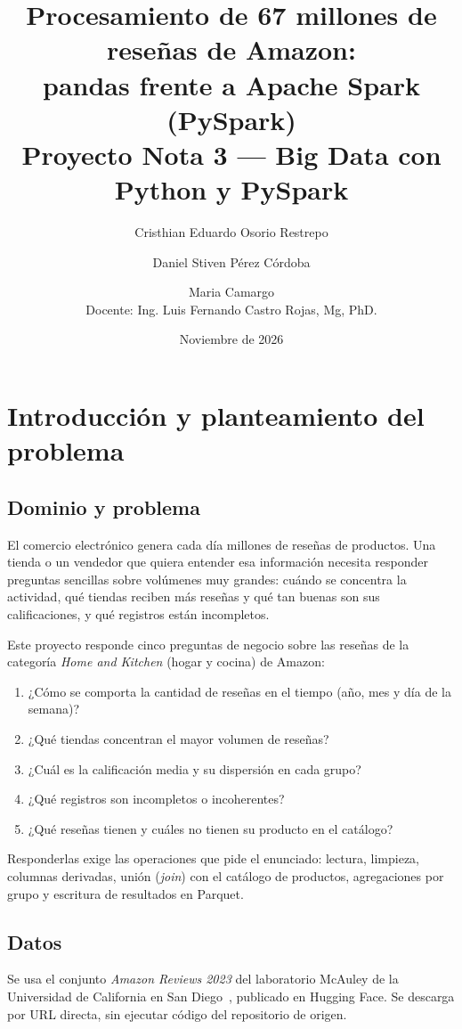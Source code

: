 \documentclass[11pt,a4paper]{article}
\title{Procesamiento de 67 millones de reseñas de Amazon:\\
pandas frente a Apache Spark (PySpark)\\[0.4em]
\large Proyecto Nota 3 — Big Data con Python y PySpark}
\author{Cristhian Eduardo Osorio Restrepo \and Daniel Stiven Pérez Córdoba \and Maria Camargo\\[0.3em]
\small Docente: Ing. Luis Fernando Castro Rojas, Mg, PhD.}
\date{Noviembre de 2026}
\begin{document}
\maketitle
\tableofcontents
\newpage

\section{Introducción y planteamiento del problema}

\subsection{Dominio y problema}

El comercio electrónico genera cada día millones de reseñas de productos. Una tienda o un
vendedor que quiera entender esa información necesita responder preguntas sencillas sobre
volúmenes muy grandes: cuándo se concentra la actividad, qué tiendas reciben más reseñas y
qué tan buenas son sus calificaciones, y qué registros están incompletos.

Este proyecto responde cinco preguntas de negocio sobre las reseñas de la categoría
\emph{Home and Kitchen} (hogar y cocina) de Amazon:

\begin{enumerate}
  \item ¿Cómo se comporta la cantidad de reseñas en el tiempo (año, mes y día de la semana)?
  \item ¿Qué tiendas concentran el mayor volumen de reseñas?
  \item ¿Cuál es la calificación media y su dispersión en cada grupo?
  \item ¿Qué registros son incompletos o incoherentes?
  \item ¿Qué reseñas tienen y cuáles no tienen su producto en el catálogo?
\end{enumerate}

Responderlas exige las operaciones que pide el enunciado: lectura, limpieza, columnas
derivadas, unión (\emph{join}) con el catálogo de productos, agregaciones por grupo y escritura
de resultados en Parquet.

\subsection{Datos}

Se usa el conjunto \emph{Amazon Reviews 2023} del laboratorio McAuley de la Universidad de
California en San Diego~\cite{hou2024}, publicado en Hugging Face. Se descarga por URL
directa, sin ejecutar código del repositorio de origen.
\end{document}
